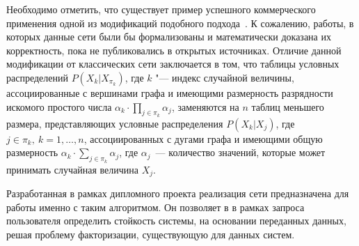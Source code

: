 Необходимо отметить, что существует пример успешного коммерческого применения одной из модификаций подобного подхода~\cite{beinlich1989alarm}. К сожалению, работы, в которых данные сети были бы формализованы и математически доказана их корректность, пока не публиковались в открытых источниках.
Отличие данной модификации от классических сети заключается в том, что таблицы условных распределений $ P(X_k | X_{\pi_k}) $, где $k$ "--- индекс случайной величины, ассоциированные с вершинами графа и имеющими размерность разрядности искомого простого числа $ \alpha_k \cdot \prod_{j \in \pi_k}\alpha_j $, заменяются на $ n $ таблиц меньшего размера, представляющих условные распределения $ P(X_k | X_j) $, где $ j \in \pi_k,\ k = 1,\dotsc,n $, ассоциированных с дугами графа и имеющими общую размерность $ \alpha_k \cdot \sum_{j \in \pi_k}\alpha_j $, где $\alpha_j$~--- количество значений, которые может принимать случайная величина $X_j$.

Разработанная в рамках дипломного проекта реализация сети предназначена для работы именно с таким алгоритмом. Он позволяет в в рамках запроса пользователя определить стойкость системы, на основании переданных данных, решая проблему факторизации, существующую для данных систем.


